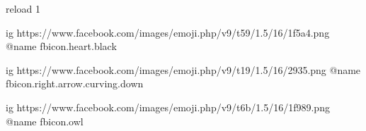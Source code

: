  
 
 
 
 

\ifcmt
	reload 1

  ig https://www.facebook.com/images/emoji.php/v9/t59/1.5/16/1f5a4.png
  @name fbicon.heart.black

	ig https://www.facebook.com/images/emoji.php/v9/t19/1.5/16/2935.png
	@name fbicon.right.arrow.curving.down

	ig https://www.facebook.com/images/emoji.php/v9/t6b/1.5/16/1f989.png
	@name fbicon.owl

\fi
